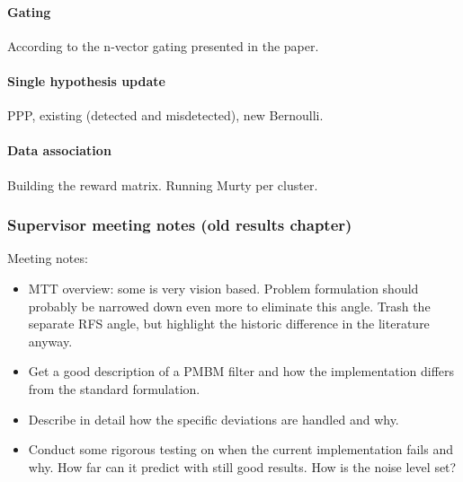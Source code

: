 \paragraph{Gating}
According to the n-vector gating presented in the paper.

\paragraph{Single hypothesis update}
PPP, existing (detected and misdetected), new Bernoulli.

\paragraph{Data association}
Building the reward matrix. Running Murty per cluster.


\subsubsection{Supervisor meeting notes (old results chapter)}
Meeting notes:
\begin{itemize}
    \item MTT overview: some is very vision based. Problem formulation should probably be narrowed down even more to eliminate this angle. Trash the separate RFS angle, but highlight the historic difference in the literature anyway.
    \item Get a good description of a PMBM filter and how the implementation differs from the standard formulation.
    \item Describe in detail how the specific deviations are handled and why.
    \item Conduct some rigorous testing on when the current implementation fails and why. How far can it predict with still good results. How is the noise level set?
\end{itemize}


